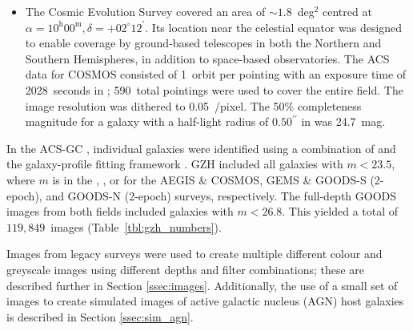 \documentclass[a4paper,fleqn,usenatbib]{mnras}
\begin{document}
\begin{itemize}
\item The Cosmic Evolution Survey \citep[COSMOS;][]{sco07} covered an area of
    $\sim1.8$~deg$^2$ centred at $\alpha=10^\textrm{h}00^\textrm{m},
    \delta=+02^\circ12^\prime$. Its location near the celestial equator was
    designed to enable coverage by ground-based telescopes in both the Northern and
    Southern Hemispheres, in addition to space-based observatories. The ACS data
    for COSMOS consisted of 1~orbit per pointing with an exposure time of
    2028~seconds in \Iband; 590~total pointings were used to cover the entire
    field. The image resolution was dithered to 0.05~\arcsec/pixel. The 50\%
    completeness magnitude for a galaxy with a half-light radius of
    $0.50^{\prime\prime}$ in \Iband{} was 24.7~mag. 

\end{itemize}

In the ACS-GC \citep{gri12}, individual galaxies were identified using a
combination of \sextractor{} \citep{ber96} and the galaxy-profile fitting
framework \galapagos{} \citep{bar12}. GZH included all galaxies with $m<23.5$,
where $m$ is in the \Iband, \zband, or \iband{} for the AEGIS \& COSMOS, GEMS \&
GOODS-S (2-epoch), and GOODS-N (2-epoch) surveys, respectively. The full-depth
GOODS images from both fields included galaxies with $m<26.8$. This yielded a
total of $119,849$~images (Table~\ref{tbl:gzh_numbers}).

Images from \hst{} legacy surveys were used to create multiple different colour
and greyscale images using different depths and filter combinations; these are
described further in Section \ref{ssec:images}. Additionally, the use of a
small set of \hst{} images to create simulated images of active galactic
nucleus (AGN) host galaxies is described in Section \ref{ssec:sim_agn}.


\end{document}
